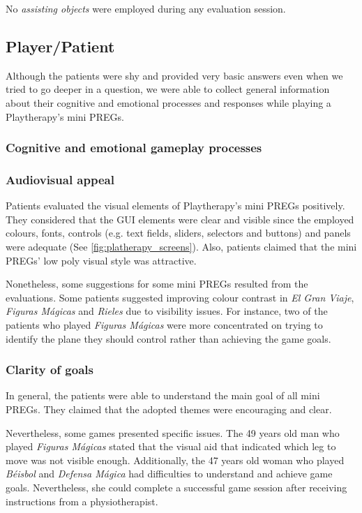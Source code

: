 No \textit{assisting objects} were employed during any evaluation session.

\subsection{Player/Patient}
Although the patients were shy and provided very basic answers even when we tried to go deeper in a question, we were able to collect general information about their cognitive and emotional processes and responses while playing a Playtherapy's mini \acp{PREG}.

\subsubsection{Cognitive and emotional gameplay processes}
\subsubsection*{Audiovisual appeal}
Patients evaluated the visual elements of Playtherapy's mini \acp{PREG} positively. They considered that the \ac{GUI} elements were clear and visible since the employed colours, fonts, controls (e.g. text fields, sliders, selectors and buttons) and panels were adequate (See \autoref{fig:platherapy_screens}). Also, patients claimed that the mini \acp{PREG}' low poly visual style was attractive.

Nonetheless, some suggestions for some mini \acp{PREG} resulted from the evaluations. Some patients suggested improving colour contrast in \textit{El Gran Viaje}, \textit{Figuras M\'agicas} and \textit{Rieles} due to visibility issues. For instance, two of the patients who played \textit{Figuras M\'agicas} were more concentrated on trying to identify the plane they should control rather than achieving the game goals.

\subsubsection*{Clarity of goals}
In general, the patients were able to understand the main goal of all mini \acp{PREG}. They claimed that the adopted themes were encouraging and clear.

Nevertheless, some games presented specific issues. The 49 years old man who played \textit{Figuras M\'agicas} stated that the visual aid that indicated which leg to move was not visible enough. Additionally, the 47 years old woman who played \textit{B\'eisbol} and \textit{Defensa M\'agica} had difficulties to understand and achieve game goals. Nevertheless, she could complete a successful game session after receiving instructions from a physiotherapist.

